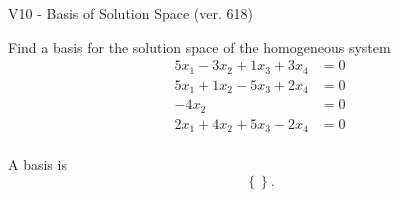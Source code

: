 \begin{exercise}
  \begin{exerciseTitle}V10 - Basis of Solution Space (ver. 618)\end{exerciseTitle}
  \begin{exerciseStatement}
    Find a basis for the solution space of the homogeneous system 
\begin{align*}
 5 x_ 1 -3 x_ 2 + 1 x_ 3 + 3 x_ 4 &= 0  \\ 
  5 x_ 1 + 1 x_ 2 -5 x_ 3 + 2 x_ 4 &= 0  \\ 
  -4 x_ 2 &= 0  \\ 
  2 x_ 1 + 4 x_ 2 + 5 x_ 3 -2 x_ 4 &= 0  \\ 
 \end{align*}


 
  \end{exerciseStatement}

  \begin{exerciseAnswer}
   A basis is   
\[\left\{\right\}.\]

  


  \end{exerciseAnswer}
\end{exercise}